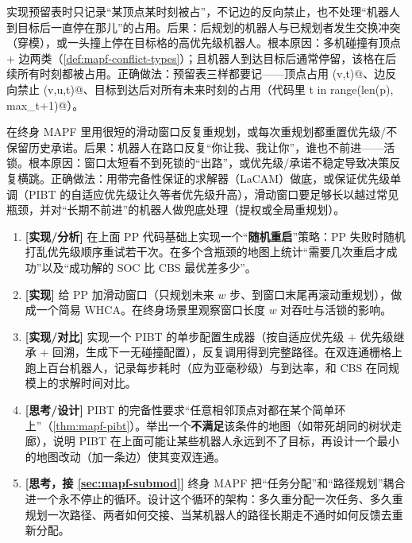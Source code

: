 \begin{pitfall}
实现预留表时只记录“某顶点某时刻被占”，不记边的反向禁止，也不处理“机器人到目标后一直停在那儿”的占用。后果：后规划的机器人与已规划者发生交换冲突（穿模），或一头撞上停在目标格的高优先级机器人。根本原因：多机碰撞有顶点 $+$ 边两类（\cref{def:mapf-conflict-types}）；且机器人到达目标后通常停留，该格在后续所有时刻都被占用。正确做法：预留表三样都要记——顶点占用 \verb@(v,t)@、边反向禁止 \verb@(v,u,t)@、目标到达后对所有未来时刻的占用（代码里 \verb@for t in range(len(p), max_t+1)@）。
\end{pitfall}

\begin{pitfall}
在终身 MAPF 里用很短的滑动窗口反复重规划，或每次重规划都重置优先级/不保留历史承诺。后果：机器人在路口反复“你让我、我让你”，谁也不前进——活锁。根本原因：窗口太短看不到死锁的“出路”，或优先级/承诺不稳定导致决策反复横跳。正确做法：用带完备性保证的求解器（LaCAM）做底，或保证优先级单调（PIBT 的自适应优先级让久等者优先级升高），滑动窗口要足够长以越过常见瓶颈，并对“长期不前进”的机器人做兜底处理（提权或全局重规划）。
\end{pitfall}

\begin{exercise}
\begin{enumerate}
  \item \textbf{[实现/分析]} 在上面 PP 代码基础上实现一个“\textbf{随机重启}”策略：PP 失败时随机打乱优先级顺序重试若干次。在多个含瓶颈的地图上统计“需要几次重启才成功”以及“成功解的 SOC 比 CBS 最优差多少”。
  \item \textbf{[实现]} 给 PP 加滑动窗口（只规划未来 $w$ 步、到窗口末尾再滚动重规划），做成一个简易 WHCA\*。在终身场景里观察窗口长度 $w$ 对吞吐与活锁的影响。
  \item \textbf{[实现/对比]} 实现一个 PIBT 的单步配置生成器（按自适应优先级 $+$ 优先级继承 $+$ 回溯，生成下一无碰撞配置），反复调用得到完整路径。在双连通栅格上跑上百台机器人，记录每步耗时（应为亚毫秒级）与到达率，和 CBS 在同规模上的求解时间对比。
  \item \textbf{[思考/设计]} PIBT 的完备性要求“任意相邻顶点对都在某个简单环上”（\cref{thm:mapf-pibt}）。举出一个\textbf{不满足}该条件的地图（如带死胡同的树状走廊），说明 PIBT 在上面可能让某些机器人永远到不了目标，再设计一个最小的地图改动（加一条边）使其变双连通。
  \item \textbf{[思考，接 \cref{sec:mapf-submod}]} 终身 MAPF 把“任务分配”和“路径规划”耦合进一个永不停止的循环。设计这个循环的架构：多久重分配一次任务、多久重规划一次路径、两者如何交接、当某机器人的路径长期走不通时如何反馈去重新分配。
\end{enumerate}
\end{exercise}

